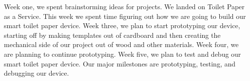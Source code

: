 
\par Week one, we spent brainstorming ideas for projects. We landed on Toilet Paper as a Service. This week we spent time figuring out how we are going to build our smart toilet paper device. Week three, we plan to start prototyping our device, starting off by making templates out of cardboard and then creating the mechanical side of our project out of wood and other materials. Week four, we are planning to continue prototyping. Week five, we plan to test and debug our smart toilet paper device. Our major milestones are prototyping, testing, and debugging our device.

